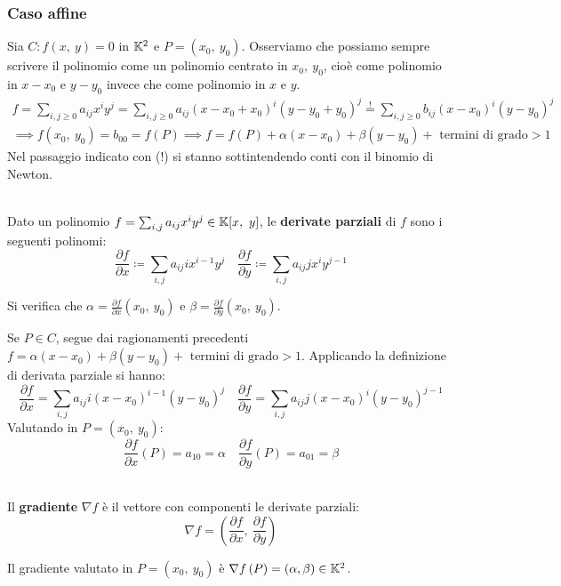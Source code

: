 \subsubsection{Caso affine}
Sia $C\colon f\left(x,\ y\right)=0$ in $\mathbb{K}^2$ e $P=(x_0,\ y_0)$. Osserviamo che possiamo sempre scrivere il polinomio come un polinomio centrato in $x_0,\ y_0$, cioè come polinomio in $x-x_0$ e $y-y_0$ invece che come polinomio in $x$ e $y$.
\begin{gather*}
		f=\sum_{i,j\geq 0} a_{ij}x^iy^j = \sum_{i,j\geq 0} a_{ij}(x-x_0+x_0)^i(y-y_0+y_0)^j \stackrel{!}{=} 	\sum_{i,j\geq 0}b_{ij}(x-x_0)^i(y-y_0)^j\\
		\implies f(x_0,\ y_0)=b_{00}=f\left(P\right) \implies f=f\left(P\right) +\alpha (x-x_0)+\beta (y-y_0)+ \text{ termini di grado} >1
\end{gather*}
Nel passaggio indicato con (!) si stanno sottintendendo conti con il binomio di Newton.\\
\begin{define}~{}\\
	Dato un polinomio $f=\sum_{i,j}a_{ij}x^iy^j\in\mathbb{K}[x,\ y]$, le \textbf{derivate parziali} di $f$ sono i seguenti polinomi:
	\begin{equation}
		\frac{\partial{f}}{\partial{x}}\coloneqq \sum_{i,j}a_{ij}ix^{i-1}y^j\quad \frac{\partial{f}}{\partial{y}}\coloneqq \sum_{i,j}a_{ij}jx^iy^{j-1}
	\end{equation}
\vspace{-3mm}
\end{define}
Si verifica che $\alpha=\frac{\partial{f}}{\partial{x}}(x_0,\ y_0)$ e $\beta=\frac{\partial{f}}{\partial{y}}(x_0,\ y_0)$.
\begin{demonstration}
	Se $P\in C$, segue dai ragionamenti precedenti $f=\alpha (x-x_0)+\beta (y-y_0)+ \text{ termini di grado} >1$. Applicando la definizione di derivata parziale si hanno:
	\begin{equation*}
		\frac{\partial{f}}{\partial{x}}= \sum_{i,j}a_{ij}i\left(x-x_0\right)^{i-1}\left(y-y_0\right)^j\quad \frac{\partial{f}}{\partial{y}}= \sum_{i,j}a_{ij}j\left(x-x_0\right)^i\left(y-y_0\right)^{j-1}
	\end{equation*}
	Valutando in $P=(x_0,\ y_0)$:
	\begin{equation*}
		\frac{\partial{f}}{\partial{x}}\left(P\right)=a_{10}=\alpha\quad \frac{\partial{f}}{\partial{y}}\left(P\right)=a_{01}=\beta
	\end{equation*}
\end{demonstration}
\begin{define}[Gradiente.]~{}\\
	Il \textbf{gradiente} $\nabla f$ è il vettore con componenti le derivate parziali:
	\begin{equation}
		\nabla f=\left( \frac{\partial{f}}{\partial{x}},\ \frac{\partial{f}}{\partial{y}} \right)
	\end{equation}
\vspace{-6mm}
\end{define}
Il gradiente valutato in $P=(x_0,\ y_0)$ è $\nabla f\left(P\right)=(\alpha,\beta)\in\mathbb{K}^2$.\\
